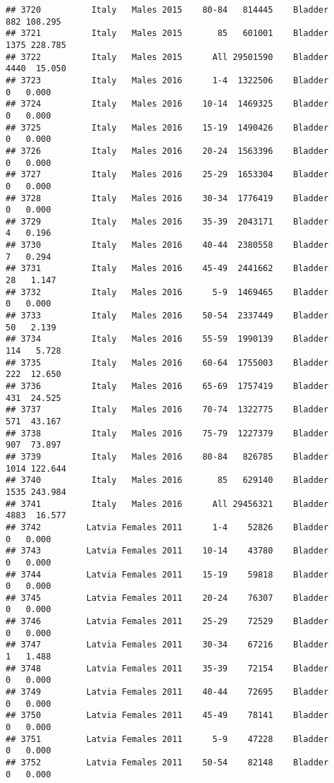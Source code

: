 \documentclass[
]{article}
\begin{document}
\begin{verbatim}
## 3720          Italy   Males 2015    80-84   814445    Bladder    882 108.295
## 3721          Italy   Males 2015       85   601001    Bladder   1375 228.785
## 3722          Italy   Males 2015      All 29501590    Bladder   4440  15.050
## 3723          Italy   Males 2016      1-4  1322506    Bladder      0   0.000
## 3724          Italy   Males 2016    10-14  1469325    Bladder      0   0.000
## 3725          Italy   Males 2016    15-19  1490426    Bladder      0   0.000
## 3726          Italy   Males 2016    20-24  1563396    Bladder      0   0.000
## 3727          Italy   Males 2016    25-29  1653304    Bladder      0   0.000
## 3728          Italy   Males 2016    30-34  1776419    Bladder      0   0.000
## 3729          Italy   Males 2016    35-39  2043171    Bladder      4   0.196
## 3730          Italy   Males 2016    40-44  2380558    Bladder      7   0.294
## 3731          Italy   Males 2016    45-49  2441662    Bladder     28   1.147
## 3732          Italy   Males 2016      5-9  1469465    Bladder      0   0.000
## 3733          Italy   Males 2016    50-54  2337449    Bladder     50   2.139
## 3734          Italy   Males 2016    55-59  1990139    Bladder    114   5.728
## 3735          Italy   Males 2016    60-64  1755003    Bladder    222  12.650
## 3736          Italy   Males 2016    65-69  1757419    Bladder    431  24.525
## 3737          Italy   Males 2016    70-74  1322775    Bladder    571  43.167
## 3738          Italy   Males 2016    75-79  1227379    Bladder    907  73.897
## 3739          Italy   Males 2016    80-84   826785    Bladder   1014 122.644
## 3740          Italy   Males 2016       85   629140    Bladder   1535 243.984
## 3741          Italy   Males 2016      All 29456321    Bladder   4883  16.577
## 3742         Latvia Females 2011      1-4    52826    Bladder      0   0.000
## 3743         Latvia Females 2011    10-14    43780    Bladder      0   0.000
## 3744         Latvia Females 2011    15-19    59818    Bladder      0   0.000
## 3745         Latvia Females 2011    20-24    76307    Bladder      0   0.000
## 3746         Latvia Females 2011    25-29    72529    Bladder      0   0.000
## 3747         Latvia Females 2011    30-34    67216    Bladder      1   1.488
## 3748         Latvia Females 2011    35-39    72154    Bladder      0   0.000
## 3749         Latvia Females 2011    40-44    72695    Bladder      0   0.000
## 3750         Latvia Females 2011    45-49    78141    Bladder      0   0.000
## 3751         Latvia Females 2011      5-9    47228    Bladder      0   0.000
## 3752         Latvia Females 2011    50-54    82148    Bladder      0   0.000

\end{verbatim}
\end{document}
